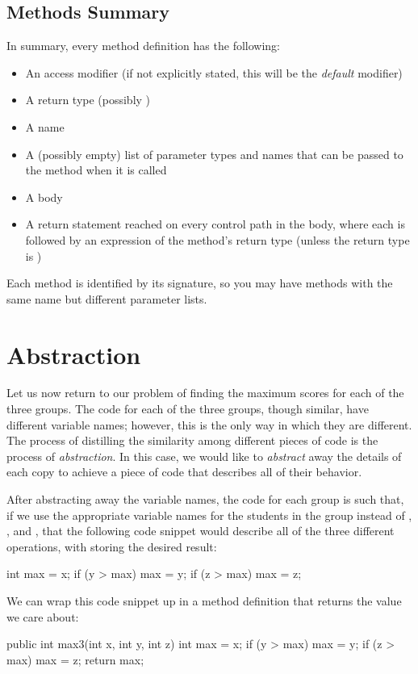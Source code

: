\subsection{Methods Summary}
In summary, every method definition has the following:
\begin{itemize}
\item An access modifier (if not explicitly stated, this will be the \emph{default} modifier)
\item A return type (possibly )
\item A name
\item A (possibly empty) list of parameter types and names that can be passed to the method when it is called
\item A body
\item A return statement reached on every control path in the body, where each  is followed by an
expression of the method's return type (unless the return type is )
\end{itemize}
Each method is identified by its signature, so you may have methods with the same name but different parameter lists.

\section{Abstraction}\label{sec:abstraction}
Let us now return to our problem of finding the maximum scores for each
of the three groups.
The code for each of the three groups, though similar, have different variable names;
however, this is the only way in which they are different.
The process of distilling the similarity among different pieces of code is
the process of \emph{abstraction}.
In this case, we would like to \emph{abstract} away the details of
each copy to achieve a piece of code that describes all of their behavior.

After abstracting away the variable names, the code for each group is such that,
if we use the appropriate variable names for the students in the group
instead of , , and , that the following code snippet
would describe all of the three different operations, with
 storing the desired result:
\begin{code}
int max = x;
if (y > max) {
  max = y; 
}
if (z > max) {
  max = z;
}
\end{code}
We can wrap this code snippet up in a method definition
that returns the value we care about:
\begin{code}
public int max3(int x, int y, int z) {
  int max = x;
  if (y > max) {
    max = y;
  }
  if (z > max) {
    max = z;
  }
  return max;
}
\end{code}

